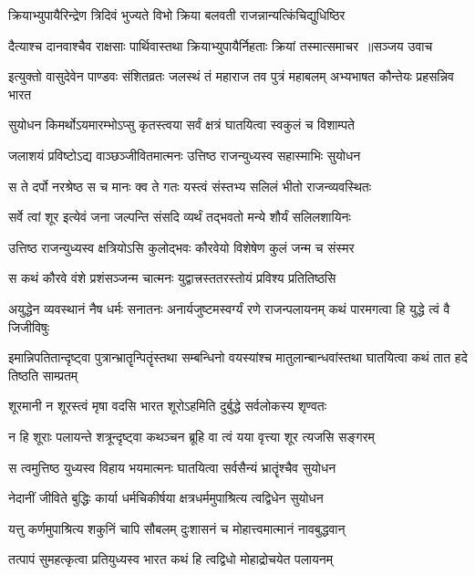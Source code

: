 \twolineshloka
{क्रियाभ्युपायैरिन्द्रेण त्रिदिवं भुज्यते विभो}
{क्रिया बलवती राजन्नान्यत्किंचिद्युधिष्ठिर}


\threelineshloka
{दैत्याश्च दानवाश्चैव राक्षसाः पार्थिवास्तथा}
{क्रियाभ्युपायैर्निहताः क्रियां तस्मात्समाचर ॥सञ्जय उवाच}
{}


\threelineshloka
{इत्युक्तो वासुदेवेन पाण्डवः संशितव्रतः}
{जलस्थं तं महाराज तव पुत्रं महाबलम्}
{अभ्यभाषत कौन्तेयः प्रहसन्निव भारत}


\twolineshloka
{सुयोधन किमर्थोऽयमारम्भोऽप्सु कृतस्त्वया}
{सर्वं क्षत्रं घातयित्वा स्वकुलं च विशाम्पते}


\twolineshloka
{जलाशयं प्रविष्टोऽद्य वाञ्छञ्जीवितमात्मनः}
{उत्तिष्ठ राजन्युध्यस्व सहास्माभिः सुयोधन}


\twolineshloka
{स ते दर्पो नरश्रेष्ठ स च मानः क्व ते गतः}
{यस्त्वं संस्तभ्य सलिलं भीतो राजन्व्यवस्थितः}


\twolineshloka
{सर्वे त्वां शूर इत्येवं जना जल्पन्ति संसदि}
{व्यर्थं तद्भवतो मन्ये शौर्यं सलिलशायिनः}


\twolineshloka
{उत्तिष्ठ राजन्युध्यस्व क्षत्रियोऽसि कुलोद्भवः}
{कौरवेयो विशेषेण कुलं जन्म च संस्मर}


\twolineshloka
{स कथं कौरवे वंशे प्रशंसञ्जन्म चात्मनः}
{युद्वात्त्रस्ततरस्तोयं प्रविश्य प्रतितिष्ठसि}


अयुद्धेन व्यवस्थानं नैष धर्मः सनातनः
\twolineshloka
{अनार्यजुष्टमस्वर्ग्यं रणे राजन्पलायनम्}
{कथं पारमगत्वा हि युद्धे त्वं वै जिजीविषुः}


\threelineshloka
{इमान्निपतितान्दृष्ट्वा पुत्रान्भ्रातॄन्पितॄंस्तथा}
{सम्बन्धिनो वयस्यांश्च मातुलान्बान्धवांस्तथा}
{घातयित्वा कथं तात हदे तिष्ठति साम्प्रतम्}


\twolineshloka
{शूरमानी न शूरस्त्वं मृषा वदसि भारत}
{शूरोऽहमिति दुर्बुद्धे सर्वलोकस्य शृण्वतः}


\twolineshloka
{न हि शूराः पलायन्ते शत्रून्दृष्ट्वा कथञ्चन}
{ब्रूहि वा त्वं यया वृत्त्या शूर त्यजसि सङ्गरम्}


\twolineshloka
{स त्वमुत्तिष्ठ युध्यस्व विहाय भयमात्मनः}
{घातयित्वा सर्वसैन्यं भ्रातॄंश्चैव सुयोधन}


\twolineshloka
{नेदानीं जीविते बुद्धिः कार्या धर्मचिकीर्षया}
{क्षत्रधर्ममुपाश्रित्य त्वद्विधेन सुयोधन}


\twolineshloka
{यत्तु कर्णमुपाश्रित्य शकुनिं चापि सौबलम्}
{दुःशासनं च मोहात्त्वमात्मानं नावबुद्धवान्}


\twolineshloka
{तत्पापं सुमहत्कृत्वा प्रतियुध्यस्व भारत}
{कथं हि त्वद्विधो मोहाद्रोचयेत पलायनम्}


